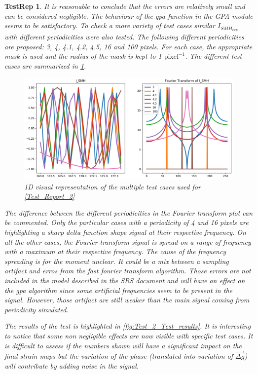 \documentclass[12pt, titlepage]{article}
\newtheorem{TestRep}{TestRep}
\begin{document}
\begin{TestRep}
It is reasonable to conclude that the errors are relatively small and can be 
considered negligible. The behaviour of the gpa function in the GPA module seems 
to be satisfactory. To check a more variety of test cases similar 
$I_{SMH_{exp}}$ with different periodicities were also tested. The following 
different periodicities are proposed: 3, 4, 4.1, 4.2, 4.5, 16 and 100 pixels. 
For each case, the appropriate mask is used and the radius of the mask is kept 
to 1 $\text{pixel}^{-1}$. The different test cases are summarized in 
\cref{fig:Test_2_Test_cases}. 

\begin{figure}[H]
\begin{center}
\includegraphics[scale=0.5]{Figures/Test_2_test_cases.png}
\caption{1D visual representation of the multiple test cases used for 
\cref{Test_Report_2}}
\label{fig:Test_2_Test_cases}
\end{center}
\end{figure}

The difference between the different periodicities in the Fourier transform plot 
can be commented. Only the particular cases with a periodicity of 4 and 16 
pixels are highlighting a sharp delta function shape signal at their respective 
frequency. On all the other cases, the Fourier transform signal is spread on a 
range of frequency with a maximum at their respective frequency. The cause of 
the frequency spreading is for the moment unclear. It could be a mix between a 
sampling artifact and erros from the fast fourier transform algorithm. Those 
errors are not included in the model described in the SRS document and will have 
an effect on the gpa algorithm since some artificial frequencies seem to be 
present in the signal. However, those artifact are still weaker than the main 
signal coming from periodicity simulated.\medskip

The results of the test is highlighted in \cref{fig:Test_2_Test_results}. It is 
interesting to notice that some non negligible effects are now visible with 
specific test cases. It is difficult to assess if the numbers shown will have a 
significant impact on the final strain maps but the variation of the phase 
(translated into variation of $\overrightarrow{\Delta g}$) will contribute by 
adding noise in the signal.


\end{TestRep}
\end{document}
